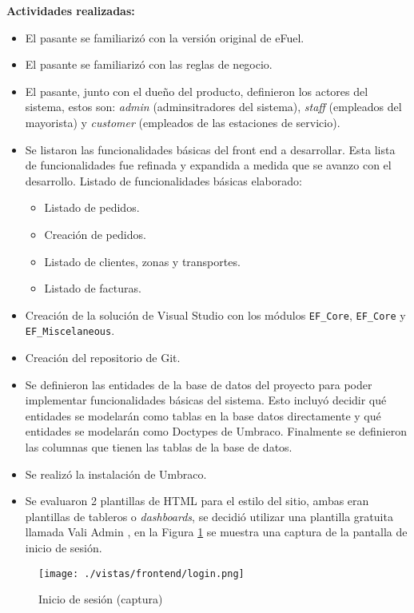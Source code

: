 \vspace{0.3cm}
\textbf{Actividades realizadas:}
\begin{itemize}
    \item El pasante se familiarizó con la versión original de eFuel.
    \item El pasante se familiarizó con las reglas de negocio.
    \item El pasante, junto con el dueño del producto, definieron los actores del sistema, estos son: \emph{admin} (adminsitradores del sistema), \emph{staff} (empleados del mayorista) y \emph{customer} (empleados de las estaciones de servicio).
    \item Se listaron las funcionalidades básicas del front end a desarrollar. Esta lista de funcionalidades fue refinada y expandida a medida que se avanzo con el desarrollo. Listado de funcionalidades básicas elaborado:
        \begin{itemize}
            \item Listado de pedidos.
            \item Creación de pedidos.
            \item Listado de clientes, zonas y transportes.
            \item Listado de facturas.
        \end{itemize}
    \item Creación de la solución de Visual Studio con los módulos \texttt{EF\_Core}, \texttt{EF\_Core} y \texttt{EF\_\-Miscelaneous}.
    \item Creación del repositorio de Git.
    \item Se definieron las entidades de la base de datos del proyecto para poder implementar funcionalidades básicas del sistema. Esto incluyó decidir qué entidades se modelarán como tablas en la base datos directamente y qué entidades se modelarán como Doctypes de Umbraco. Finalmente se definieron las columnas que tienen las tablas de la base de datos.
    \item Se realizó la instalación de Umbraco.
    \item Se evaluaron 2 plantillas de HTML para el estilo del sitio, ambas eran plantillas de tableros o \emph{dashboards}, se decidió utilizar una plantilla gratuita llamada Vali Admin \cite{valiAdmin}, en la Figura \ref{fig:orderslist} se muestra una captura de la pantalla de inicio de sesión.
\end{itemize}

\begin{figure}[H]
    \centering
    \texttt{[image: ./vistas/frontend/login.png]}
    \caption{Inicio de sesión (captura)}
    \label{fig:orderslist}
\end{figure}

